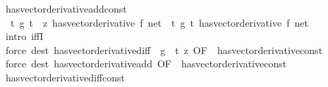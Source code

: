 \begin{isabellebody}
\endisatagproof
{\isafoldproof}%
%
\isadelimproof
\isanewline
%
\endisadelimproof
\isanewline
{}\isamarkupfalse%
\ has{\isacharunderscore}{\kern0pt}vector{\isacharunderscore}{\kern0pt}derivative{\isacharunderscore}{\kern0pt}add{\isacharunderscore}{\kern0pt}const{\isacharcolon}{\kern0pt}\isanewline
\ \ {\isachardoublequoteopen}{\isacharparenleft}{\kern0pt}{\isacharparenleft}{\kern0pt}{\isasymlambda}t{\isachardot}{\kern0pt}\ g\ t\ {\isacharplus}{\kern0pt}\ z{\isacharparenright}{\kern0pt}\ has{\isacharunderscore}{\kern0pt}vector{\isacharunderscore}{\kern0pt}derivative\ f{\isacharprime}{\kern0pt}{\isacharparenright}{\kern0pt}\ net\ {\isacharequal}{\kern0pt}\ {\isacharparenleft}{\kern0pt}{\isacharparenleft}{\kern0pt}{\isasymlambda}t{\isachardot}{\kern0pt}\ g\ t{\isacharparenright}{\kern0pt}\ has{\isacharunderscore}{\kern0pt}vector{\isacharunderscore}{\kern0pt}derivative\ f{\isacharprime}{\kern0pt}{\isacharparenright}{\kern0pt}\ net{\isachardoublequoteclose}\isanewline
%
\isadelimproof
\ \ %
\endisadelimproof
%
\isatagproof
{}\isamarkupfalse%
\ {\isacharparenleft}{\kern0pt}intro\ iffI{\isacharparenright}{\kern0pt}\isanewline
\ \ \ \isamarkupfalse%
\ {\isacharparenleft}{\kern0pt}force\ dest{\isacharcolon}{\kern0pt}\ has{\isacharunderscore}{\kern0pt}vector{\isacharunderscore}{\kern0pt}derivative{\isacharunderscore}{\kern0pt}diff\ {\isacharbrackleft}{\kern0pt}\ g\ {\isacharequal}{\kern0pt}\ {\isachardoublequoteopen}{\isasymlambda}t{\isachardot}{\kern0pt}\ z{\isachardoublequoteclose}{\isacharcomma}{\kern0pt}\ OF\ {\isacharunderscore}{\kern0pt}\ has{\isacharunderscore}{\kern0pt}vector{\isacharunderscore}{\kern0pt}derivative{\isacharunderscore}{\kern0pt}const{\isacharbrackright}{\kern0pt}{\isacharparenright}{\kern0pt}\isanewline
\ \ \isamarkupfalse%
\ {\isacharparenleft}{\kern0pt}force\ dest{\isacharcolon}{\kern0pt}\ has{\isacharunderscore}{\kern0pt}vector{\isacharunderscore}{\kern0pt}derivative{\isacharunderscore}{\kern0pt}add\ {\isacharbrackleft}{\kern0pt}OF\ {\isacharunderscore}{\kern0pt}\ has{\isacharunderscore}{\kern0pt}vector{\isacharunderscore}{\kern0pt}derivative{\isacharunderscore}{\kern0pt}const{\isacharbrackright}{\kern0pt}{\isacharparenright}{\kern0pt}\isanewline
\ \ \isamarkupfalse%
%
\endisatagproof
{\isafoldproof}%
%
\isadelimproof
\isanewline
%
\endisadelimproof
\isanewline
{}\isamarkupfalse%
\ has{\isacharunderscore}{\kern0pt}vector{\isacharunderscore}{\kern0pt}derivative{\isacharunderscore}{\kern0pt}diff{\isacharunderscore}{\kern0pt}const{\isacharcolon}{\kern0pt}\isanewline

\end{isabellebody}
